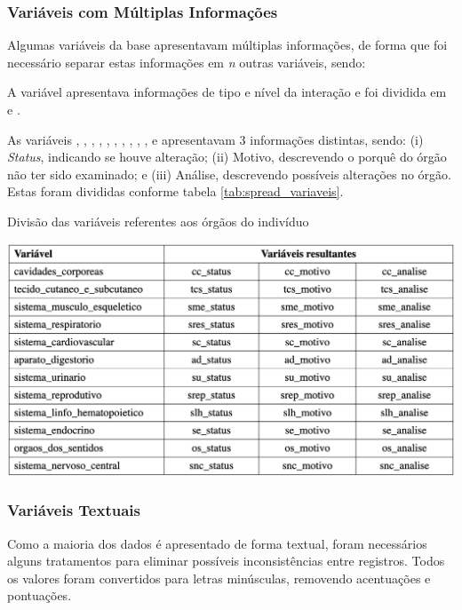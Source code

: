 \documentclass[12pt]{article}
\begin{document}
\subsubsection{Variáveis com Múltiplas Informações}

Algumas variáveis da base apresentavam múltiplas informações, de forma que foi necessário separar estas informações em \textit{n} outras variáveis, sendo:

A variável  apresentava informações de tipo e nível da interação e foi dividida em  e .

As variáveis , ,  , , , , , , , ,  e  apresentavam 3 informações distintas, sendo: (i) \textit{Status}, indicando se houve alteração; (ii) Motivo, descrevendo o porquê do órgão não ter sido examinado; e (iii) Análise, descrevendo possíveis alterações no órgão. Estas foram divididas conforme tabela \ref{tab:spread_variaveis}.

\begin{table}[ht]
\centering
\caption{Divisão das variáveis referentes aos órgãos do indivíduo}
\label{tab:spread_variaveis}
\includegraphics[width=.8\textwidth]{tabela_spread_variaveis.png}
\end{table}

\subsubsection{Variáveis Textuais}

Como a maioria dos dados é apresentado de forma textual, foram necessários alguns tratamentos para eliminar possíveis inconsistências entre registros. Todos os valores foram convertidos para letras minúsculas, removendo acentuações e pontuações.
\end{document}
